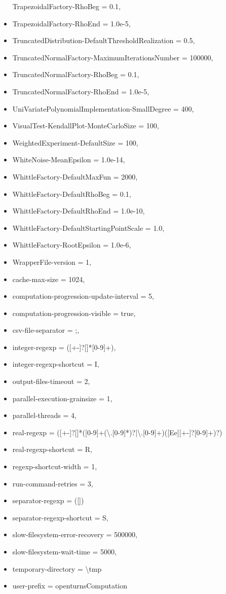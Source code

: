 \begin{itemize}
  TrapezoidalFactory-RhoBeg = 0.1,
\item
  TrapezoidalFactory-RhoEnd = 1.0e-5,
\item
  TruncatedDistribution-DefaultThresholdRealization = 0.5,
\item
  TruncatedNormalFactory-MaximumIterationsNumber = 100000,
\item
  TruncatedNormalFactory-RhoBeg = 0.1,
\item
  TruncatedNormalFactory-RhoEnd = 1.0e-5,
\item
  UniVariatePolynomialImplementation-SmallDegree = 400,
\item
  VisualTest-KendallPlot-MonteCarloSize = 100,
\item
  WeightedExperiment-DefaultSize = 100,
\item
  WhiteNoise-MeanEpsilon = 1.0e-14,
\item
  WhittleFactory-DefaultMaxFun = 2000,
\item
  WhittleFactory-DefaultRhoBeg = 0.1,
\item
  WhittleFactory-DefaultRhoEnd = 1.0e-10,
\item
  WhittleFactory-DefaultStartingPointScale = 1.0,
\item
  WhittleFactory-RootEpsilon = 1.0e-6,
\item
  WrapperFile-version = 1,
\item
  cache-max-size = 1024,
\item
  computation-progression-update-interval = 5,
\item
  computation-progression-visible = true,
\item
  csv-file-separator = ;,
\item
  integer-regexp = ([+-]?[\hspace*{2cm}]*[0-9]+),
\item
  integer-regexp-shortcut = I,
\item
  output-files-timeout = 2,
\item
  parallel-execution-grainsize = 1,
\item
  parallel-threads = 4,
\item
  real-regexp =  ([+-]?[\hspace*{2cm}]*([0-9]+(\textbackslash.[0-9]*)?|\textbackslash.[0-9]+)([Ee][+-]?[0-9]+)?)
\item
  real-regexp-shortcut = R,
\item
  regexp-shortcut-width = 1,
\item
  run-command-retries = 3,
\item
  separator-regexp =  ([\hspace*{2cm}])
\item
  separator-regexp-shortcut = S,
\item
  slow-filesystem-error-recovery = 500000,
\item
  slow-filesystem-wait-time = 5000,
\item
  temporary-directory = \textbackslash tmp
\item
  user-prefix = openturnsComputation
\end{itemize}




